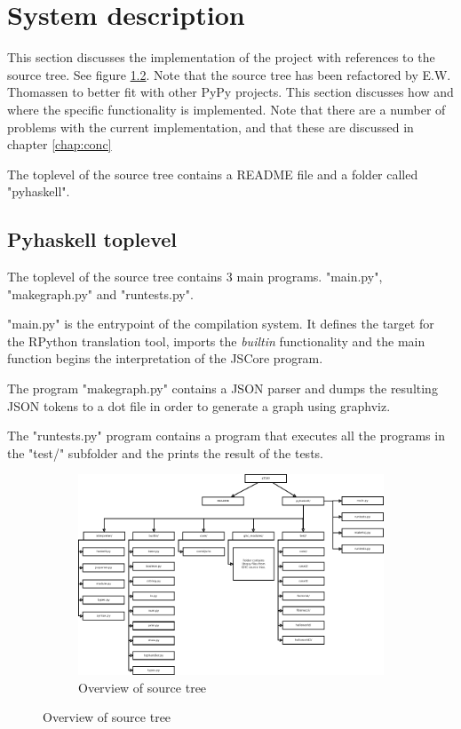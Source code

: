 

\chapter{System description}
\label{chap:impl}

This section discusses the implementation of the project with
references to the source tree. See figure \ref{fig:overview}.
Note that the source tree has been refactored by E.W. Thomassen
to better fit with other PyPy projects. This section discusses how
and where the specific functionality is implemented. Note that there
are a number of problems with the current implementation, and that
these are discussed in chapter \ref{chap:conc}

The toplevel of the source tree contains a README file and a folder
called "pyhaskell".

\section{Pyhaskell toplevel}

The toplevel of the source tree contains 3 main programs. "main.py",
"makegraph.py" and "runtests.py".

"main.py" is the entrypoint of the compilation system. It defines
the target for the RPython translation tool, imports the \emph{builtin}
functionality and the main function begins the interpretation of the
JSCore program.

The program "makegraph.py" contains a JSON parser and dumps the resulting
JSON tokens to a dot file in order to generate a graph using graphviz.

The "runtests.py" program contains a program that executes all the programs
in the "test/" subfolder and the prints the result of the tests.

\begin{figure}
\begin{figure}[H]
\centering
\includegraphics[width=\textheight]{../diags/overview.pdf}

\caption{Overview of source tree}
\label{fig:overview}

\end{figure}
\end{figure}

